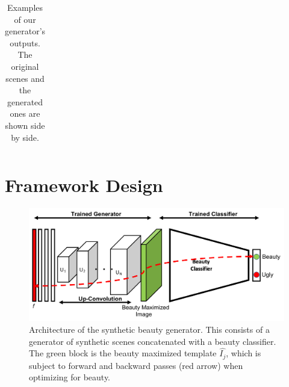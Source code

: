 \begin{table}
\begin{centering}
\begin{tabular}{l*2{C}@{}}
            \bottomrule 
        \end{tabular}
        \caption{Examples of our generator's outputs. The original scenes and the generated ones are shown side by side.}
        \label{fig:GanExample}
        
    \end{centering}
\end{table} 

\section{Framework Design}



\begin{figure}[t!]
    \centering
    \includegraphics[width=\columnwidth]{AM_arch.pdf}
    \caption{Architecture of the synthetic beauty generator. This consists of a generator of synthetic scenes concatenated with a beauty classifier. The green block is the beauty maximized template $\hat{I_j}$, which is subject to  forward and backward passes (red arrow) when optimizing for beauty.}
    \label{fig:AM_arch}
\end{figure}

\begin{table}[t]
    \caption{Notations}\label{notations}
\end{table}

